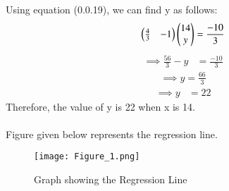 \documentclass[journal,12pt,twocolumn]{IEEEtran}
\begin{document}
Using equation (0.0.19), we can find y as follows:\\
\begin{align}
    \begin{pmatrix}\frac{4}{3} & -1\end{pmatrix}\begin{pmatrix}14 \\ y\end{pmatrix} = \frac{-10}{3}
\end{align}
\begin{align}
    \implies \frac{56}{3} - y &= \frac{-10}{3}
\end{align}    
\begin{align}
   \implies y = \frac{66}{3}
\end{align}
\begin{align}
    \implies y &= 22 
\end{align}
Therefore, the value of y is 22 when x is 14.\\\\
Figure given below represents the regression line.
\begin{figure}[ht]
    \centering
    \texttt{[image: Figure\_1.png]}
    \caption{Graph showing the Regression Line}
    \label{Figure_1}
\end{figure}
\end{document}
